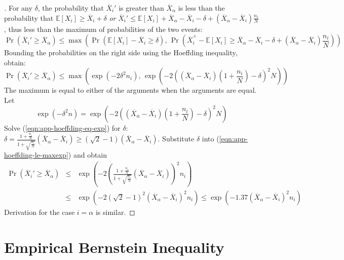 \documentclass{article}
\newcommand {\IE} {\ensuremath {\mathbb{E}}}
\begin{document}
\begin{proof}[]
For any $\delta$, the probability that $\overline X_i'$ is greater
than $\overline X_\alpha$ is less than the probability that $\IE[X_i]\ge\overline
X_i+\delta$ \emph{or} $\overline X_i'\le \IE[X_i]+\overline X_\alpha - \overline
  X_i - \delta +(\overline X_\alpha - \overline X_i)\frac {n_i} N$, thus
less than the maximum of probabilities of the two events:
\begin{equation}
\Pr(\overline X_i'\ge \overline X_\alpha)\le
  \max\left(\Pr(\IE[X_i]-\overline X_i \ge \delta),\,
  \Pr\left(\overline X_i^+ - \IE[X_i] \ge \overline X_\alpha - \overline
  X_i - \delta +(\overline X_\alpha - \overline X_i)\frac {n_i} N\right)\right)
\end{equation}
Bounding the probabilities on the right side using the Hoeffding
inequality, obtain:
\begin{equation}
\Pr(\overline X_i'\ge \overline X_\alpha)\le 
\max\left(\exp(-2\delta^2n_i),\,
          \exp\left(-2\left((\overline X_\alpha 
          - \overline X_i)\left(1+\frac {n_i} N\right)
          - \delta\right)^2N\right)\right)
\label{eqn:app-hoeffding-le-maxexp}
\end{equation}
The maximum is equal to either of the arguments when the arguments are equal. Let
\begin{equation}
\exp(-\delta^2n) = \exp(-2\left((\overline X_\alpha - \overline X_i)(1+\frac {n_i} N) - \delta\right)^2N)\label{eqn:app-hoeffding-eq-exp}
\end{equation}
Solve (\ref{eqn:app-hoeffding-eq-exp}) for $\delta$: $\delta=\frac {1+\frac {n_i} N} {1+\sqrt {\frac {n_i} N}} (\overline X_\alpha
- \overline X_i) \ge (\sqrt 2 - 1)(\overline X_\alpha-\overline X_i)$. Substitute $\delta$ into 
(\ref{eqn:app-hoeffding-le-maxexp}) and obtain
\begin{eqnarray}
\Pr(\overline X_i'\ge \overline X_\alpha) 
& \le & \exp\left(-2\left( \frac {1+\frac {n_i} N} {1+\sqrt {\frac {n_i} N}}
                          (\overline X_\alpha - \overline X_i)\right)^2 n_i\right)\nonumber \\
& \le & \exp(-2(\sqrt 2 - 1)^2(\overline X_\alpha - \overline X_i)^2n_i)
 \le \exp(-1.37(\overline X_\alpha - \overline X_i)^2n_i)
\end{eqnarray}
Derivation for the case $i=\alpha$ is similar.
\end{proof}

\section{Empirical Bernstein Inequality}
\label{app:deriv-conc-empbernstein}
\end{document}
